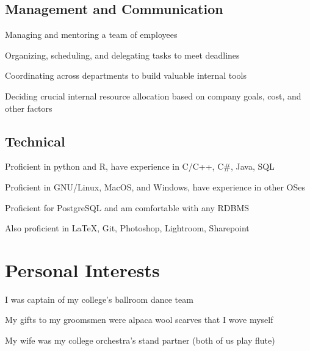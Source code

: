 \documentclass[]{deedy-resume-openfont}
\begin{document}
\begin{minipage}[t]{0.66\textwidth}
\subsection{Management and Communication}
\vspace{\topsep} %
\begin{tightemize}
	\item Managing and mentoring a team of employees
	\item Organizing, scheduling, and delegating tasks to meet deadlines
	\item Coordinating across departments to build valuable internal tools
	\item Deciding crucial internal resource allocation based on company goals, cost, and other factors
\end{tightemize}
\subsection{Technical}
\vspace{\topsep} %
\begin{tightemize}
\item Proficient in python and R, have experience in C/C++, C\#, Java, SQL
\item Proficient in GNU/Linux, MacOS, and Windows, have experience in other OSes
\item Proficient for PostgreSQL and am comfortable with any RDBMS
\item Also proficient in \LaTeX, Git, Photoshop, Lightroom, Sharepoint
\end{tightemize}

\section{Personal Interests}
\vspace{\topsep} %
\begin{tightemize}
\item I was captain of my college's ballroom dance team
\item My gifts to my groomsmen were alpaca wool scarves that I wove myself
\item My wife was my college orchestra's stand partner (both of us play flute)
\end{tightemize}




\end{minipage}
\end{document}
